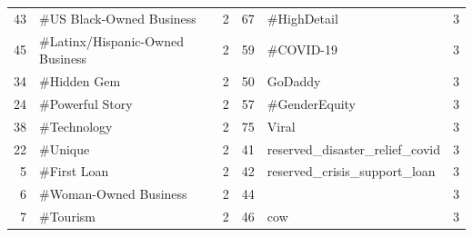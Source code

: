 \begin{longtable}{|r|l|l|r|l|l|}
    43                                & \#US Black-Owned Business          & 2                                                       & 67                               & \#HighDetail                        & 3                                                      \\
    45                                & \#Latinx/Hispanic-Owned Business   & 2                                                       & 59                               & \#COVID-19                          & 3                                                      \\
    34                                & \#Hidden Gem                       & 2                                                       & 50                               & GoDaddy                             & 3                                                      \\
    24                                & \#Powerful Story                   & 2                                                       & 57                               & \#GenderEquity                      & 3                                                      \\
    38                                & \#Technology                       & 2                                                       & 75                               & Viral                               & 3                                                      \\
    22                                & \#Unique                           & 2                                                       & 41                               & reserved\_disaster\_relief\_covid   & 3                                                      \\
    5                                 & \#First Loan                       & 2                                                       & 42                               & reserved\_crisis\_support\_loan     & 3                                                      \\
    6                                 & \#Woman-Owned Business             & 2                                                       & 44                               &                                     & 3                                                      \\
    7                                 & \#Tourism                          & 2                                                       & 46                               & cow                                 & 3                                                      \\

\end{longtable}
